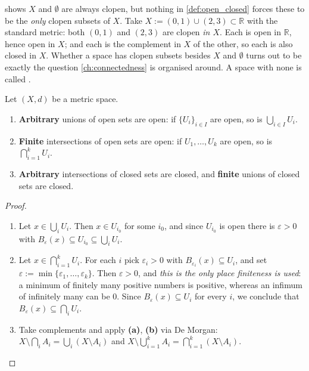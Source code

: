 \begin{example}
\label{ex:clopen_nontrivial}
 shows $X$ and $\emptyset$ are always clopen, but nothing in
\cref{def:open_closed} forces these to be the \emph{only} clopen subsets of $X$. Take
$X := (0,1)\cup(2,3) \subset \mathbb{R}$ with the standard metric: both $(0,1)$ and $(2,3)$ are
clopen \emph{in $X$}. Each is open in $\mathbb{R}$, hence open in $X$; and each is the complement
in $X$ of the other, so each is also closed in $X$. Whether a space has clopen subsets besides
$X$ and $\emptyset$ turns out to be exactly the question \cref{ch:connectedness} is organised
around. A space with none is called .
\end{example}

\begin{proposition}
\label{prop:open_closed_operations}
Let $(X,d)$ be a metric space.
\begin{enumerate}[label=\textbf{(\alph*)}]
  \item \label{item:arbitrary_union_open}
    \textbf{Arbitrary} unions of open sets are open: if $\{U_i\}_{i \in I}$ are open, so is
    $\bigcup_{i\in I}U_i$.
  \item \label{item:finite_intersection_open}
    \textbf{Finite} intersections of open sets are open: if $U_1,\dots,U_k$ are open, so is
    $\bigcap_{i=1}^{k}U_i$.
  \item \textbf{Arbitrary} intersections of closed sets are closed, and \textbf{finite} unions
    of closed sets are closed.
\end{enumerate}
\end{proposition}

\begin{proof}
\begin{enumerate}[label=\textbf{(\alph*)}]
  \item Let $x \in \bigcup_i U_i$. Then $x \in U_{i_0}$ for some $i_0$, and since $U_{i_0}$
    is open there is $\varepsilon>0$ with
    $B_\varepsilon(x) \subseteq U_{i_0} \subseteq \bigcup_iU_i$.
  \item Let $x \in \bigcap_{i=1}^kU_i$. For each $i$ pick $\varepsilon_i>0$ with
    $B_{\varepsilon_i}(x) \subseteq U_i$, and set
    $\varepsilon := \min\{\varepsilon_1,\dots,\varepsilon_k\}$.
    Then $\varepsilon > 0$, and \emph{this is the only place finiteness is used}: a minimum of
    finitely many positive numbers is positive, whereas an infimum of infinitely many can be $0$.
    Since $B_\varepsilon(x) \subseteq U_i$ for every $i$, we conclude that
    $B_\varepsilon(x) \subseteq \bigcap_iU_i$.
  \item Take complements and apply \textbf{(a)}, \textbf{(b)} via De Morgan:
    $X\setminus\bigcap_iA_i = \bigcup_i(X\setminus A_i)$ and
    $X\setminus\bigcup_{i=1}^kA_i = \bigcap_{i=1}^k(X\setminus A_i)$.
\end{enumerate}
\end{proof}

